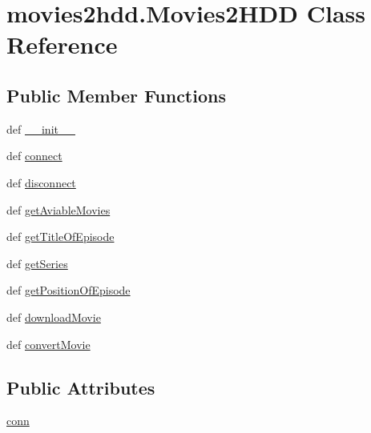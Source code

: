 \hypertarget{classmovies2hdd_1_1_movies2_h_d_d}{\section{movies2hdd.\-Movies2\-H\-D\-D Class Reference}
\label{classmovies2hdd_1_1_movies2_h_d_d}
}
\subsection*{Public Member Functions}
\begin{DoxyCompactItemize}
\item 
def \hyperlink{classmovies2hdd_1_1_movies2_h_d_d_a6652371462723d08b714c32324f5a80f}{\-\_\-\-\_\-init\-\_\-\-\_\-}
\item 
def \hyperlink{classmovies2hdd_1_1_movies2_h_d_d_af1ae63dd9190690575b5b288a52af8a5}{connect}
\item 
def \hyperlink{classmovies2hdd_1_1_movies2_h_d_d_a37549cf56f3067c26f46dabe91178fb5}{disconnect}
\item 
def \hyperlink{classmovies2hdd_1_1_movies2_h_d_d_a2675dbf00e8e9ddbc463e802d98d6f57}{get\-Aviable\-Movies}
\item 
def \hyperlink{classmovies2hdd_1_1_movies2_h_d_d_af70b18fab503d288570e9c97e3e0cc46}{get\-Title\-Of\-Episode}
\item 
def \hyperlink{classmovies2hdd_1_1_movies2_h_d_d_acb59a16cd1c2d832772a1cd6db28b2a6}{get\-Series}
\item 
def \hyperlink{classmovies2hdd_1_1_movies2_h_d_d_a9624d2e28e7a965f3385ac27ae8ad380}{get\-Position\-Of\-Episode}
\item 
def \hyperlink{classmovies2hdd_1_1_movies2_h_d_d_a5f7d4ca7f7c30de9cfa305282ac63fbf}{download\-Movie}
\item 
def \hyperlink{classmovies2hdd_1_1_movies2_h_d_d_afafc16b9fc0e83485db9b47d7ba7e386}{convert\-Movie}
\end{DoxyCompactItemize}
\subsection*{Public Attributes}
\begin{DoxyCompactItemize}
\item 
\hyperlink{classmovies2hdd_1_1_movies2_h_d_d_a0b93dbfa80fc06d13d8cdad9ea7bae0b}{conn}
\end{DoxyCompactItemize}
